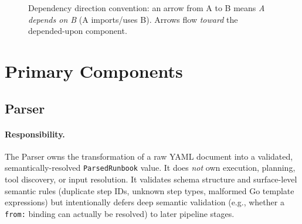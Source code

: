 \begin{figure}[H]
\centering
{}
\caption{Dependency direction convention: an arrow from A to B means \emph{A depends on B} (A imports/uses B). Arrows flow \emph{toward} the depended-upon component.}
\label{fig:dependency-direction}
\end{figure}

\section{Primary Components}

\subsection{Parser}

\paragraph{Responsibility.}
The Parser owns the transformation of a raw YAML document into a validated, semantically-resolved
\texttt{ParsedRunbook} value. It does \emph{not} own execution, planning, tool discovery, or input resolution.
It validates schema structure and surface-level semantic rules (duplicate step IDs, unknown step types,
malformed Go template expressions) but intentionally defers deep semantic validation (e.g., whether a
\texttt{from:} binding can actually be resolved) to later pipeline stages.

